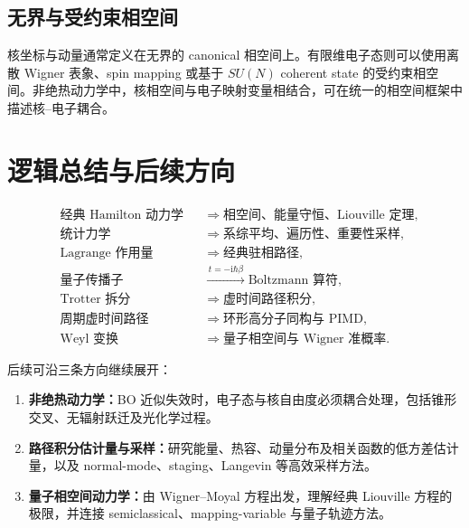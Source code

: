 \documentclass[11pt,a4paper,oneside,openany,fontset=fandol]{ctexbook}
\newcommand{\ii}{\mathrm{i}}
\begin{document}
\section{无界与受约束相空间}

核坐标与动量通常定义在无界的 canonical 相空间上。有限维电子态则可以使用离散 Wigner 表象、spin mapping 或基于 $SU(N)$ coherent state 的受约束相空间。非绝热动力学中，核相空间与电子映射变量相结合，可在统一的相空间框架中描述核--电子耦合。

\chapter{逻辑总结与后续方向}

\begin{routebox}
\[
\begin{aligned}
&\text{经典 Hamilton 动力学}
&&\Rightarrow\text{相空间、能量守恒、Liouville 定理},\\
&\text{统计力学}
&&\Rightarrow\text{系综平均、遍历性、重要性采样},\\
&\text{Lagrange 作用量}
&&\Rightarrow\text{经典驻相路径},\\
&\text{量子传播子}
&&\xrightarrow{\,t=-\ii\hbar\beta\,}\text{Boltzmann 算符},\\
&\text{Trotter 拆分}
&&\Rightarrow\text{虚时间路径积分},\\
&\text{周期虚时间路径}
&&\Rightarrow\text{环形高分子同构与 PIMD},\\
&\text{Weyl 变换}
&&\Rightarrow\text{量子相空间与 Wigner 准概率}.
\end{aligned}
\]
\end{routebox}

后续可沿三条方向继续展开：

\begin{enumerate}
\item \textbf{非绝热动力学：}BO 近似失效时，电子态与核自由度必须耦合处理，包括锥形交叉、无辐射跃迁及光化学过程。
\item \textbf{路径积分估计量与采样：}研究能量、热容、动量分布及相关函数的低方差估计量，以及 normal-mode、staging、Langevin 等高效采样方法。
\item \textbf{量子相空间动力学：}由 Wigner--Moyal 方程出发，理解经典 Liouville 方程的极限，并连接 semiclassical、mapping-variable 与量子轨迹方法。
\end{enumerate}
\end{document}
